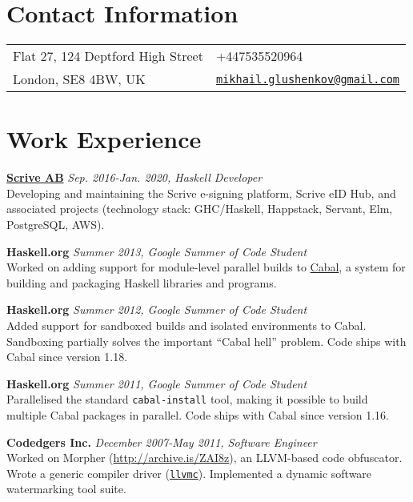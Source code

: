 \documentclass[margin,line]{res}
\begin{document}

\begin{resume}
\section{\sc Contact Information}
\vspace{.05in}
\begin{tabular}{@{}p{2in}p{4in}}
Flat 27, 124 Deptford High Street&
+447535520964\\
London, SE8 4BW, UK&
\href{mailto:mikhail.glushenkov@gmail.com}
{\texttt{mikhail.glushenkov@gmail.com}}\\
\end{tabular}

\section{\sc Work Experience}

{\bf \href{http://scrive.com}{Scrive AB}} \hfill {\it Sep. 2016-Jan. 2020, Haskell Developer}\\
Developing and maintaining the Scrive e-signing platform, Scrive eID
Hub, and associated projects (technology stack: GHC/Haskell,
Happstack, Servant, Elm, PostgreSQL, AWS).

{\bf Haskell.org} \hfill {\it Summer 2013, Google Summer of Code Student}\\
Worked on adding support for module-level parallel builds to
\href{http://haskell.org/cabal}{Cabal}, a system for building and
packaging Haskell libraries and programs.

{\bf Haskell.org} \hfill {\it Summer 2012, Google Summer of Code Student}\\
Added support for sandboxed builds and isolated environments to
Cabal. Sandboxing partially solves the important ``Cabal hell'' problem. Code
ships with Cabal since version 1.18.

{\bf Haskell.org} \hfill {\it Summer 2011, Google Summer of Code Student}\\
Parallelised the standard \texttt{cabal-install} tool, making it possible to
build multiple Cabal packages in parallel. Code ships with Cabal since version
1.16.

{\bf Codedgers Inc.} \hfill {\it December 2007-May 2011, Software Engineer}\\
Worked on Morpher (\url{http://archive.is/ZAI8z}), an LLVM-based code
obfuscator. Wrote a generic compiler driver
(\href{http://llvm.org/releases/2.9/docs/CompilerDriver.html}{\texttt{llvmc}}). Implemented
a dynamic software watermarking tool suite.


\end{resume}
\end{document}
